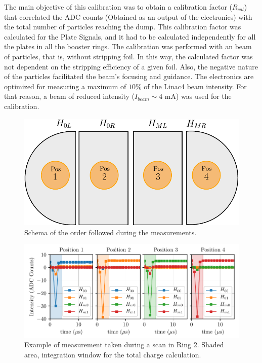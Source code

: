 The main objective of this calibration was to obtain a calibration factor ($R_{cal}$) that correlated the ADC counts (Obtained as an output of the electronics) with the total number of particles reaching the dump. This calibration factor was calculated for the Plate Signals, and it had to be calculated independently for all the plates in all the booster rings. The calibration was performed with an \hm beam of particles, that is, without stripping foil. In this way, the calculated factor was not dependent on the stripping efficiency of a given foil. Also, the negative nature of the \hm particles facilitated the beam's focusing and guidance. The electronics are optimized for measuring a maximum of $10 \%$ of the Linac4 beam intensity. For that reason, a beam of reduced intensity ($I_{beam} \sim 4$ mA) was used for the calibration.  

\begin{figure}[h]
    \centering
    \includegraphics[width=0.65\columnwidth]{Figure_OrderMeasurement/OrderMeas.pdf}
    \caption{Schema of the order followed during the measurements. }
    \label{fig:MeasSeq}
\end{figure}

\begin{figure}[h]
    \centering
    \includegraphics[width=1.0\columnwidth]{Figure_ExampleCalCalculation/ExampleScan.pdf}
    \caption{Example of measurement taken during a scan in Ring 2. Shaded area, integration window for the total charge calculation. }
    \label{fig:PlateSignalExample}
\end{figure}


